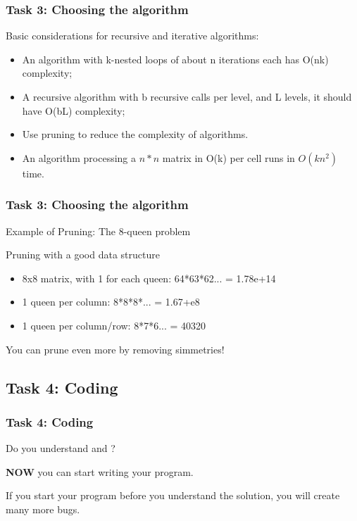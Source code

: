\documentclass{beamer}
\begin{document}
\begin{frame}
  \frametitle{Task 3: Choosing the algorithm}
  Basic considerations for recursive and iterative algorithms:

  \begin{itemize}
  \item An algorithm with k-nested loops of about n iterations each
    has O(nk) complexity;
  \item A recursive algorithm with b recursive calls per level, and L
    levels, it should have O(bL) complexity;
  \item Use pruning to reduce the complexity of algorithms.
  \item An algorithm processing a $n*n$ matrix in O(k) per cell runs
    in $O(kn^2)$ time. 
  \end{itemize}
\end{frame}

\begin{frame}
  \frametitle{Task 3: Choosing the algorithm}
  
  Example of Pruning: The 8-queen problem

  \vfill
  
  \begin{block}{Pruning with a good data structure}
    \begin{itemize}
    \item 8x8 matrix, with 1 for each queen: 64*63*62... = 1.78e+14
    \item 1 queen per column: 8*8*8*... = 1.67+e8
    \item 1 queen per column/row: 8*7*6... = 40320
    \end{itemize}
  \end{block}

  \bigskip

  You can prune even more by removing simmetries!
\end{frame}

\subsection{Task 4: Coding}

\begin{frame}
  \frametitle{Task 4: Coding}

  Do you understand  and ?

  \bigskip

  {\bf NOW} you can start writing your program.

  \vfill

  \begin{block}{}
    If you start your program before you understand the solution, you
    will create many more bugs.
  \end{block}
\end{frame}
\end{document}
